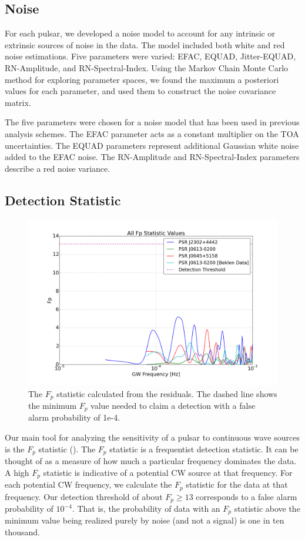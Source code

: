 \documentclass[12pt]{article}
\begin{document}
\subsection{Noise}
   For each pulsar, we developed a noise model to account for any intrinsic or
extrinsic sources of noise in the data. The model included both white and red
noise estimations. Five parameters were varied: EFAC, EQUAD, Jitter-EQUAD,
RN-Amplitude, and RN-Spectral-Index. Using the Markov Chain Monte Carlo method
for exploring parameter spaces, we found the maximum a posteriori values for
each parameter, and used them to construct the noise covariance matrix.

The five parameters were chosen for a noise model that has been used in
previous analysis schemes. The EFAC parameter acts as a constant multiplier on
the TOA uncertainties. The EQUAD parameters represent additional Gaussian white
noise added to the EFAC noise. The RN-Amplitude and RN-Spectral-Index parameters
describe a red noise variance. 

\subsection{Detection Statistic}

\begin{figure}[h!]
\caption{The $F_p$ statistic calculated from the residuals. The dashed line shows
    the minimum $F_p$ value needed to claim a detection with a false alarm probability
    of 1e-4.}
\includegraphics[width=\textwidth]{./figures/both_fp_presentation.png}
\end{figure}

    Our main tool for analyzing the sensitivity of a pulsar to continuous wave
sources is the $F_p$ statistic (\cite{Arz2014}). The
$F_p$ statistic is a frequentist detection statistic. It can be thought of as a
measure of how much a particular frequency dominates the data. A high $F_p$
statistic is indicative of a potential CW source at that frequency. For each
potential CW frequency, we calculate the $F_p$ statistic for the data at that
frequency. Our detection threshold of about $F_p \geq 13$ corresponds to a false
alarm probability of $10^{-4}$. That is, the probability of data with an $F_p$
statistic above the minimum value being realized purely by noise (and not a
signal) is one in ten thousand.
\end{document}

